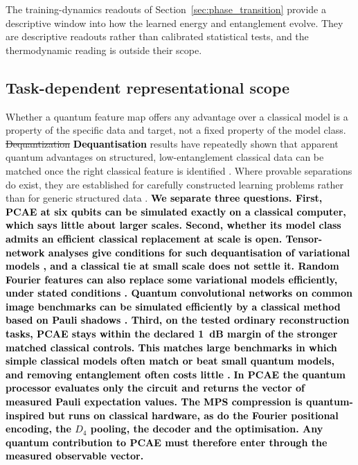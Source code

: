 \documentclass[pdflatex,sn-basic]{sn-jnl}
\newcommand{\del}[1]{\sout{#1}}
\newcommand{\add}[1]{\textbf{\textcolor{black}{#1}}}
\begin{document}
The training-dynamics readouts of Section~\ref{sec:phase_transition} provide a
descriptive window into how the learned energy and entanglement evolve. They are
descriptive readouts rather than calibrated statistical tests, and the
thermodynamic reading is outside their scope.

\subsection{Task-dependent representational scope}
\label{sec:dequant}
\label{sec:representativeness}

Whether a quantum feature map offers any advantage over a classical model is a property of the specific data and target, not a fixed property of the model class. \del{Dequantization} \add{Dequantisation} results have repeatedly shown that apparent quantum advantages on structured, low-entanglement classical data can be matched once the right classical feature is identified \citep{Huang2021PowerData, Tang2019}. Where provable separations do exist, they are established for carefully constructed learning problems rather than for generic structured data \citep{Gyurik2023}. \add{We separate
three questions. First, PCAE at six qubits can be simulated exactly on a
classical computer, which says little about larger scales. Second, whether its
model class admits an efficient classical replacement at scale is open.
Tensor-network analyses give conditions for such dequantisation of variational
models \citep{Shin2024Dequant}, and a classical tie at small scale does not
settle it. Random Fourier features can also replace some variational
models efficiently, under stated conditions \citep{Sweke2025}. Quantum
convolutional networks on common image benchmarks can be simulated efficiently
by a classical method based on Pauli shadows \citep{Bermejo2026}. Third, on the tested ordinary reconstruction tasks, PCAE stays within the
declared 1~dB margin of the stronger matched classical controls. This matches large benchmarks in which simple classical models
often match or beat small quantum models, and removing entanglement often costs
little \citep{Bowles2024}.} \add{In PCAE the
quantum processor evaluates only the circuit and returns the vector of measured
Pauli expectation values. The MPS compression is quantum-inspired but runs on
classical hardware, as do the Fourier positional encoding, the $D_4$ pooling,
the decoder and the optimisation. Any quantum contribution to PCAE must
therefore enter through the measured observable vector.}
\end{document}
